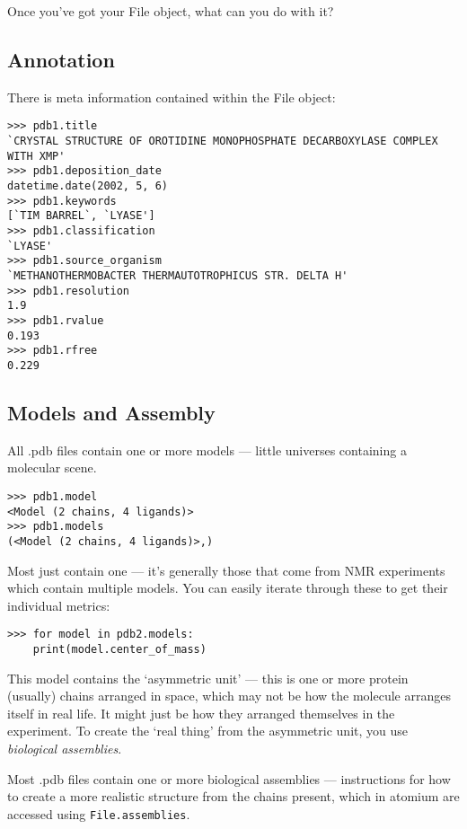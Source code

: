 Once you've got your File object, what can you do with it?

\subsection{Annotation}

There is meta information contained within the File object:

\begin{verbatim}
>>> pdb1.title
`CRYSTAL STRUCTURE OF OROTIDINE MONOPHOSPHATE DECARBOXYLASE COMPLEX WITH XMP'
>>> pdb1.deposition_date
datetime.date(2002, 5, 6)
>>> pdb1.keywords
[`TIM BARREL`, `LYASE']
>>> pdb1.classification
`LYASE'
>>> pdb1.source_organism
`METHANOTHERMOBACTER THERMAUTOTROPHICUS STR. DELTA H'
>>> pdb1.resolution
1.9
>>> pdb1.rvalue
0.193
>>> pdb1.rfree
0.229
\end{verbatim}

\subsection{Models and Assembly}

All .pdb files contain one or more models --- little universes containing a
molecular scene.

\begin{verbatim}
>>> pdb1.model
<Model (2 chains, 4 ligands)>
>>> pdb1.models
(<Model (2 chains, 4 ligands)>,)
\end{verbatim}

Most just contain one --- it's generally those that come from NMR experiments which contain multiple models. You can easily iterate through these to get their individual metrics:

\begin{verbatim}
>>> for model in pdb2.models:
    print(model.center_of_mass)
\end{verbatim}

This model contains the `asymmetric unit' --- this is one or more protein
(usually) chains arranged in space, which may not be how the molecule arranges
itself in real life. It might just be how they arranged themselves in the
experiment. To create the `real thing' from the asymmetric unit, you use
\emph{biological assemblies}.

Most .pdb files contain one or more biological assemblies --- instructions for how
to create a more realistic structure from the chains present, which in atomium
are accessed using \texttt{File.assemblies}.

